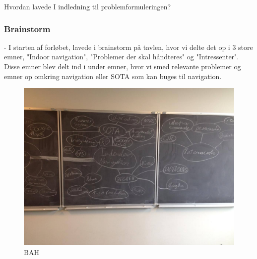 \documentclass[a4paper,12pt,twoside,openright]{memoir}
\begin{document}
        Hvordan lavede I indledning til problemformuleringen?

        \subsubsection{Brainstorm}
        
        - I starten af forløbet, lavede i brainstorm på tavlen, hvor vi delte det op i 3 store  emner, "Indoor navigation", "Problemer der skal håndteres" og "Intressenter". Disse emner blev delt ind i under emner, hvor vi smed relevante problemer og emner op omkring navigation eller SOTA som kan buges til navigation. 

        \begin{figure}
        \centering
            \begin{minipage}{0.45\textwidth}
                \centering
                \includegraphics[width=\textwidth]{Images/1.jpg}
                \caption{BAH}
                \label{4}
            \end{minipage}
            \begin{minipage}{0.45\textwidth}
                \centering

\end{minipage}
\end{figure}
\end{document}
